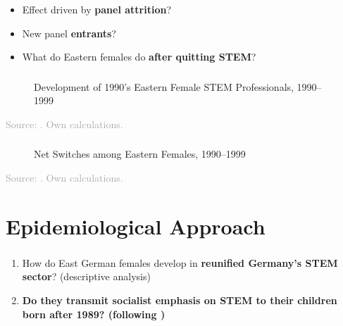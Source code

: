 \documentclass[11pt, aspectratio=1610, xcolor={dvipsnames}]{beamer}
\newcommand{\highlight}[1]{\textbf{\textcolor{PineGreen}{#1}}}
\begin{document}
	\begin{frame}
		\frametitle{}
		
		\begin{itemize}
			\item Effect driven by \highlight{panel attrition}?
			\item New panel \highlight{entrants}?
			\item What do Eastern females do \highlight{after quitting STEM}?
		\end{itemize}
		
	\end{frame}
	
	\begin{frame}
		\frametitle{}
		
		\begin{figure}[h]
			\centering
			\caption{Development of 1990's Eastern Female STEM Professionals, 1990--1999}
			\label{fig:survival}
			\resizebox{75mm}{!}{}
		\end{figure}
		
		{\scriptsize
			\textcolor{darkgray}{Source: \cite{SOEP2023}. Own calculations.}
		}
		
	\end{frame}
	
	\begin{frame}
		\frametitle{}
		
		\begin{figure}[h]
			\centering
			\caption{Net Switches among Eastern Females, 1990--1999}
			\label{fig:eastern_female_tracking}
			\resizebox{75mm}{!}{}
		\end{figure}
		
		{\scriptsize
			\textcolor{darkgray}{Source: \cite{SOEP2023}. Own calculations.}
		}
		
	\end{frame}
	
	\section{Epidemiological Approach}
	\begin{frame}
		\frametitle{}
		
		\begin{enumerate}
			\item How do East German females develop in \highlight{reunified Germany's STEM sector}? (descriptive analysis)
			\item \textbf{Do they \highlight{transmit} socialist emphasis on STEM to their children born after 1989? (following \cite{Fernandez2011})}
		\end{enumerate}
		
	\end{frame}
	
\end{document}
